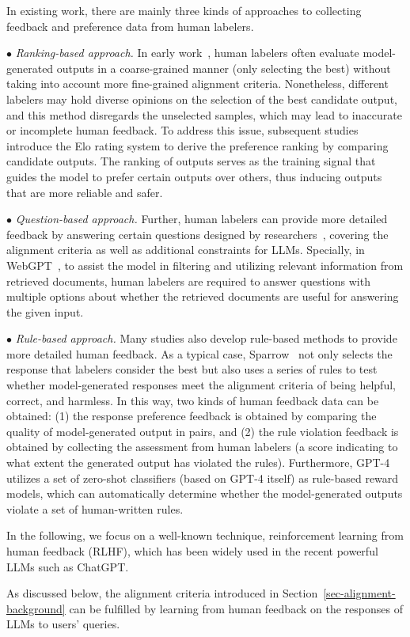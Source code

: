 {  In existing work, there are mainly three kinds of approaches to collecting  feedback and preference data from human labelers.

$\bullet$ \emph{Ranking-based approach.} In early work~\cite{Ziegler-arxiv-2019-Fine-Tuning}, human labelers often evaluate model-generated outputs in a coarse-grained manner (\ie only selecting the best) without taking into account more fine-grained alignment criteria. Nonetheless, different labelers may hold diverse opinions on the selection of the best candidate output, and this method disregards the unselected samples, which may lead to inaccurate or incomplete human feedback.
To address this issue, subsequent studies~\cite{Glaese-arxiv-2022-Improving} introduce {the Elo rating system} to derive the preference ranking by comparing candidate outputs. 
{The ranking of outputs serves as the training signal that guides the model to prefer certain outputs over others, thus inducing outputs that are more reliable and safer.} 

$\bullet$ \emph{Question-based approach.}
Further, human labelers can provide more detailed feedback by answering certain questions designed by researchers~\cite{Nakano-arxiv-2021-WebGPT}, covering the alignment criteria as well as additional constraints for LLMs. Specially, in WebGPT~\cite{Nakano-arxiv-2021-WebGPT}, to assist the model in  filtering and utilizing relevant information from retrieved documents, human labelers are required to answer questions with multiple options about whether the retrieved documents are useful for answering the given input. 

$\bullet$ \emph{Rule-based approach.}
Many studies also develop rule-based methods to provide more detailed human feedback.
As a typical case, Sparrow~\cite{Glaese-arxiv-2022-Improving} not only selects the response that labelers consider the best but also uses a series of rules to test whether model-generated responses meet the alignment criteria of being helpful, correct, and harmless.  
In this way, two kinds of human feedback data can be obtained: (1) the response preference feedback is obtained by comparing the quality of model-generated output in pairs, and (2) the rule violation feedback is obtained by collecting the assessment from human labelers (\ie a score indicating to what extent the generated output has violated the rules). 
{Furthermore,  GPT-4~\cite{OpenAI-OpenAI-2023-GPT-4} utilizes a set of zero-shot classifiers (based on GPT-4 itself) as rule-based reward models, which can automatically determine whether the model-generated outputs violate a set of human-written rules.
}

In the following, we focus on a well-known technique, reinforcement learning from human feedback (RLHF), which has been widely  used in the recent powerful LLMs such as ChatGPT.} As discussed below, the alignment criteria introduced in %
{Section~\ref{sec-alignment-background}} can be fulfilled by learning from human feedback on the responses of LLMs to users' queries. 

